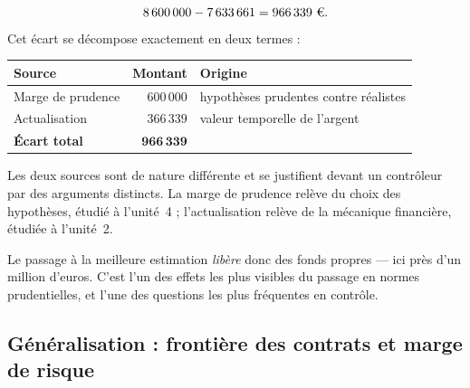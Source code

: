 \begin{corrige}
\[
  8\,600\,000 - 7\,633\,661 = 966\,339\ \text{\euro}.
\]
Cet écart se décompose exactement en deux termes :
\begin{center}\small
\begin{tabular}{lrl}
\toprule
Source & Montant & Origine \\
\midrule
Marge de prudence   & $600\,000$ & hypothèses prudentes contre réalistes \\
Actualisation       & $366\,339$ & valeur temporelle de l'argent \\
\midrule
\textbf{Écart total} & $\mathbf{966\,339}$ & \\
\bottomrule
\end{tabular}
\end{center}

\medskip
Les deux sources sont de nature différente et se justifient devant un contrôleur
par des arguments distincts. La marge de prudence relève du choix des hypothèses,
étudié à l'unité~4 ; l'actualisation relève de la mécanique financière, étudiée
à l'unité~2.

Le passage à la meilleure estimation \emph{libère} donc des fonds propres --- ici
près d'un million d'euros. C'est l'un des effets les plus visibles du passage
en normes prudentielles, et l'une des questions les plus fréquentes en contrôle.
\end{corrige}

\subsection{Généralisation : frontière des contrats et marge de risque}

